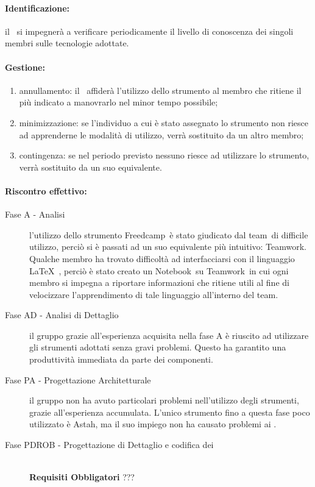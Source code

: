 \documentclass[../PianoProgetto.tex]{subfiles}
\begin{document}
	
	\paragraph*{Identificazione:} il \responsabilediprogetto\ si impegnerà a verificare periodicamente il livello di conoscenza dei singoli membri sulle tecnologie adottate.
	
	\paragraph*{Gestione:}
	\begin{enumerate}
		\item annullamento: il \responsabilediprogetto\ affiderà l'utilizzo dello strumento al membro che ritiene il più indicato a manovrarlo nel minor tempo possibile;
		\item minimizzazione: se l'individuo a cui è stato assegnato lo strumento non riesce ad apprenderne le modalità di utilizzo, verrà sostituito da un altro membro;
		\item contingenza: se nel periodo previsto nessuno riesce ad utilizzare lo strumento, verrà sostituito da un suo equivalente. 
	\end{enumerate}		
	
	\paragraph*{Riscontro effettivo:} 
		\begin{description}
			\item[Fase A - Analisi] l'utilizzo dello strumento Freedcamp\g\ è stato giudicato dal team\g\ di difficile utilizzo, perciò si è passati ad un suo equivalente più intuitivo: Teamwork\g .
	Qualche membro ha trovato difficoltà ad interfacciarsi con il linguaggio \LaTeX\  , perciò è stato creato un Notebook\g\ su Teamwork\g\ in cui ogni membro si impegna a riportare informazioni che ritiene utili al fine di velocizzare l'apprendimento di tale linguaggio all'interno del team\g .
			\item[Fase AD - Analisi di Dettaglio] il gruppo grazie all'esperienza acquisita nella fase A è riuscito ad utilizzare gli strumenti adottati senza gravi problemi. Questo ha garantito una produttività immediata da parte dei componenti. 
			\item[Fase PA - Progettazione Architetturale] il gruppo non ha avuto particolari problemi nell'utilizzo degli strumenti, grazie all'esperienza accumulata. L'unico strumento fino a questa fase poco utilizzato è Astah\g, ma il suo impiego non ha causato problemi ai \progettisti.
			\item[Fase PDROB - Progettazione di Dettaglio e codifica dei]  \ \\
					\textbf{Requisiti Obbligatori} ???
		\end{description}
		
\end{document}
